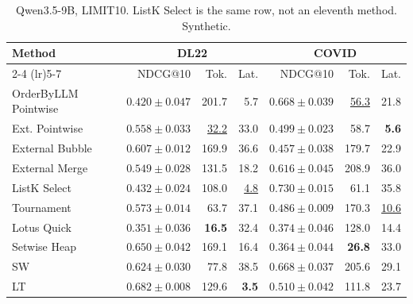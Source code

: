 \begin{table}[t]
\centering\footnotesize\setlength{\tabcolsep}{3.2pt}\renewcommand{\arraystretch}{1.12}
\caption{Qwen3.5-9B, LIMIT10. ListK Select is the same row, not an eleventh method. Synthetic.}
\begin{tabular}{@{}lrrrrrr@{}}
\toprule
Method & \multicolumn{3}{c}{DL22} & \multicolumn{3}{c}{COVID} \\
\cmidrule(lr){2-4} \cmidrule(lr){5-7}
 & NDCG@10 & Tok. & Lat. & NDCG@10 & Tok. & Lat. \\
\midrule
OrderByLLM Pointwise & $0.420\pm0.047$ & 201.7 & 5.7 & $0.668\pm0.039$ & \underline{56.3} & 21.8 \\
Ext. Pointwise & $0.558\pm0.033$ & \underline{32.2} & 33.0 & $0.499\pm0.023$ & 58.7 & \textbf{5.6} \\
External Bubble & $0.607\pm0.012$ & 169.9 & 36.6 & $0.457\pm0.038$ & 179.7 & 22.9 \\
External Merge & $0.549\pm0.028$ & 131.5 & 18.2 & $0.616\pm0.045$ & 208.9 & 36.0 \\
ListK Select & $0.432\pm0.024$ & 108.0 & \underline{4.8} & \textbf{$0.730\pm0.015$} & 61.1 & 35.8 \\
Tournament & $0.573\pm0.014$ & 63.7 & 37.1 & $0.486\pm0.009$ & 170.3 & \underline{10.6} \\
Lotus Quick & $0.351\pm0.036$ & \textbf{16.5} & 32.4 & $0.374\pm0.046$ & 128.0 & 14.4 \\
Setwise Heap & \underline{$0.650\pm0.042$} & 169.1 & 16.4 & $0.364\pm0.044$ & \textbf{26.8} & 33.0 \\
SW & $0.624\pm0.030$ & 77.8 & 38.5 & \underline{$0.668\pm0.037$} & 205.6 & 29.1 \\
LT & \textbf{$0.682\pm0.008$} & 129.6 & \textbf{3.5} & $0.510\pm0.042$ & 111.8 & 23.7 \\
\bottomrule
\end{tabular}
\end{table}

